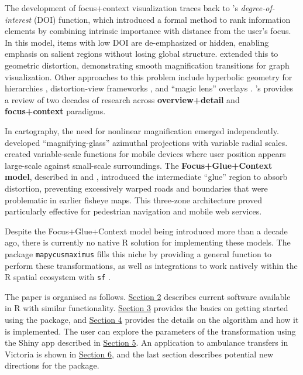 The development of focus+context visualization traces back to \citet{furnas1986}'s \emph{degree-of-interest} (DOI) function, which introduced a formal method to rank information elements by combining intrinsic importance with distance from the user's focus. In this model, items with low DOI are de-emphasized or hidden, enabling emphasis on salient regions without losing global structure. \citeauthor{sarkar1992} \citetext{\citeyear{sarkar1992}; \citealp{sarkar1994}} extended this to geometric distortion, demonstrating smooth magnification transitions for graph visualization. Other approaches to this problem include hyperbolic geometry for hierarchies \citep{lamping1995}, distortion-view frameworks \citep{carpendale2001}, and ``magic lens'' overlays \citep{bier1993}. \citet{cockburn2008}'s provides a review of two decades of research across \textbf{overview+detail} and \textbf{focus+context} paradigms.

In cartography, the need for nonlinear magnification emerged independently. \citet{snyder1987} developed ``magnifying-glass'' azimuthal projections with variable radial scales. \citet{harrie2002} created variable-scale functions for mobile devices where user position appears large-scale against small-scale surroundings. The \textbf{Focus+Glue+Context model}, described in \citet{yamamoto2009} and \citet{yamamoto2012}, introduced the intermediate ``glue'' region to absorb distortion, preventing excessively warped roads and boundaries that were problematic in earlier fisheye maps. This three-zone architecture proved particularly effective for pedestrian navigation and mobile web services.

Despite the Focus+Glue+Context model being introduced more than a decade ago, there is currently no native R solution for implementing these models. The package \texttt{mapycusmaximus} fills this niche by providing a general function to perform these transformations, as well as integrations to work natively within the R spatial ecosystem with \texttt{sf} \citep{RJ-2018-009}.

The paper is organised as follows. \hyperref[background]{Section 2} describes current software available in R with similar functionality. \hyperref[usage]{Section 3} provides the basics on getting started using the package, and \hyperref[implementation]{Section 4} provides the details on the algorithm and how it is implemented. The user can explore the parameters of the transformation using the Shiny app described in \hyperref[shiny]{Section 5}. An application to ambulance transfers in Victoria is shown in \hyperref[application]{Section 6}, and the last section describes potential new directions for the package.

